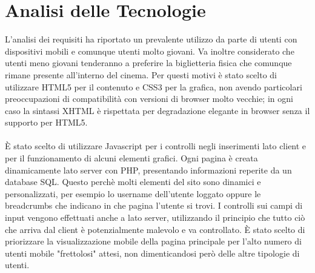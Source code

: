\documentclass[a4paper, 12pt]{article}
\begin{document}
\section{Analisi delle Tecnologie}
L'analisi dei requisiti ha riportato un prevalente utilizzo da parte di utenti con dispositivi mobili e comunque utenti molto giovani.
Va inoltre considerato che utenti meno giovani tenderanno a preferire la biglietteria fisica che comunque rimane presente all'interno del cinema.
Per questi motivi è stato scelto di utilizzare HTML5 per il contenuto e CSS3 per la grafica, non avendo particolari preoccupazioni di compatibilità con versioni di browser molto vecchie; in ogni caso la sintassi
XHTML è rispettata per degradazione elegante in browser senza il supporto per HTML5.\\\\
È stato scelto di utilizzare Javascript per i controlli negli inserimenti lato client e per il funzionamento di alcuni elementi grafici.
Ogni pagina è creata dinamicamente lato server con PHP, presentando informazioni reperite da un database SQL. Questo perchè molti elementi del sito sono dinamici e personalizzati, per esempio lo username dell'utente loggato oppure le breadcrumbs che indicano in che pagina l'utente si trovi.
I controlli sui campi di input vengono effettuati anche a lato server, utilizzando il principio che tutto ciò che arriva dal client è potenzialmente malevolo e va controllato.
È stato scelto di priorizzare la visualizzazione mobile della pagina principale per l'alto numero di utenti mobile "frettolosi" attesi, non dimenticandosi però delle altre tipologie di utenti.
\newpage
\end{document}
